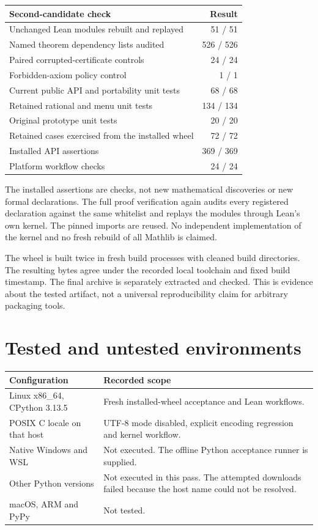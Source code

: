 \begin{center}
\small
\begin{tabularx}{\textwidth}{@{}Xr@{}}
\toprule
Second-candidate check & Result\\
\midrule
Unchanged Lean modules rebuilt and replayed & 51 / 51\\
Named theorem dependency lists audited & 526 / 526\\
Paired corrupted-certificate controls & 24 / 24\\
Forbidden-axiom policy control & 1 / 1\\
Current public API and portability unit tests & 68 / 68\\
Retained rational and menu unit tests & 134 / 134\\
Original prototype unit tests & 20 / 20\\
Retained cases exercised from the installed wheel & 72 / 72\\
Installed API assertions & 369 / 369\\
Platform workflow checks & 24 / 24\\
\bottomrule
\end{tabularx}
\end{center}

The installed assertions are checks, not new mathematical discoveries or new formal declarations. The full proof verification again audits every registered declaration against the same whitelist and replays the modules through Lean's own kernel. The pinned imports are reused. No independent implementation of the kernel and no fresh rebuild of all Mathlib is claimed.

The wheel is built twice in fresh build processes with cleaned build directories. The resulting bytes agree under the recorded local toolchain and fixed build timestamp. The final archive is separately extracted and checked. This is evidence about the tested artifact, not a universal reproducibility claim for arbitrary packaging tools.

\section{Tested and untested environments}

\begin{center}
\small
\begin{tabularx}{\textwidth}{@{}lX@{}}
\toprule
Configuration & Recorded scope\\
\midrule
Linux x86\_64, CPython 3.13.5 & Fresh installed-wheel acceptance and Lean workflows.\\
POSIX C locale on that host & UTF-8 mode disabled, explicit encoding regression and kernel workflow.\\
Native Windows and WSL & Not executed. The offline Python acceptance runner is supplied.\\
Other Python versions & Not executed in this pass. The attempted downloads failed because the host name could not be resolved.\\
macOS, ARM and PyPy & Not tested.\\
\bottomrule
\end{tabularx}
\end{center}

